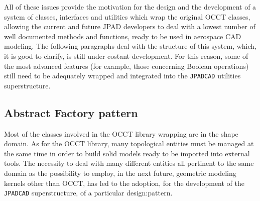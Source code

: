 \bigskip
\noindent
All of these issues provide the motivation for the design and the development of a system of classes, interfaces and utilities which wrap the original \gls{OCCT} classes, allowing the current and future \gls{JPAD} developers to deal with a lowest number of well documented methods and functions, ready to be used in aerospace \gls{CAD} modeling. The following paragraphs deal with the structure of this system, which, it is good to clarify, is still under costant development. For this reason, some of the most advanced features (for example, those concerning Boolean operations) still need to be adequately wrapped and integrated into the \lstinline[language=Java]!JPADCAD! utilities superstructure.

\subsection{Abstract Factory pattern}
\label{sec2.3.1}

Most of the classes involved in the \gls{OCCT} library wrapping are in the shape domain. As for the \gls{OCCT} library, many topological entities must be managed at the same time in order to build solid models ready to be imported into external tools. The necessity to deal with many different entities all pertinent to the same domain as the possibility to employ, in the next future, geometric modeling kernels other than \gls{OCCT}, has led to the adoption, for the development of the \lstinline[language=Java]!JPADCAD! superstructure, of a particular \gls{design:pattern}. 

